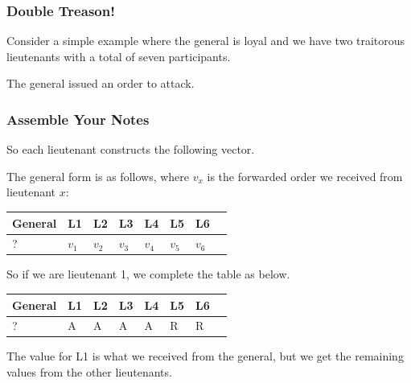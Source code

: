 \begin{frame}
	\frametitle{Double Treason!}

	Consider a simple example where the general is loyal and we have two traitorous lieutenants with a total of seven participants.

	The general issued an order to attack.

	\begin{center}
	\end{center}

\end{frame}

\begin{frame}
	\frametitle{Assemble Your Notes}

	So each lieutenant constructs the following vector.

	The general form is as follows, where $v_{x}$ is the forwarded order we received from lieutenant $x$:

	\begin{center}
		\begin{tabular}{|l|l|l|l|l|l|l|l|}
			\hline
			General & L1      & L2      & L3      & L4      & L5      & L6      \\
			\hline
			?       & $v_{1}$ & $v_{2}$ & $v_{3}$ & $v_{4}$ & $v_{5}$ & $v_{6}$ \\
			\hline
		\end{tabular}
	\end{center}

	So if we are lieutenant 1, we complete the table as below.
	\begin{center}
		\begin{tabular}{|l|l|l|l|l|l|l|l|}
			\hline
			General & L1 & L2 & L3 & L4 & L5 & L6 \\
			\hline
			?       & A  & A  & A  & A  & R  & R  \\
			\hline
		\end{tabular}
	\end{center}

	The value for L1 is what we received from the general, but we get the remaining values from the other lieutenants.

\end{frame}

